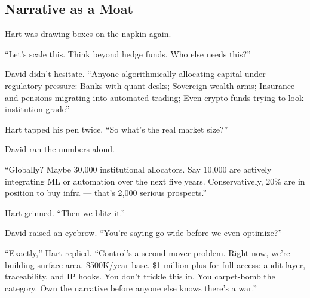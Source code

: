
\subsection{Narrative as a Moat}

Hart was drawing boxes on the napkin again.

``Let’s scale this. Think beyond hedge funds. Who else needs this?''

David didn’t hesitate.  
``Anyone algorithmically allocating capital under regulatory pressure:
  Banks with quant desks;  
  Sovereign wealth arms; 
  Insurance and pensions migrating into automated trading; 
  Even crypto funds trying to look institution-grade''

Hart tapped his pen twice. ``So what’s the real market size?''

David ran the numbers aloud.

``Globally? Maybe 30{,}000 institutional allocators.  
Say 10{,}000 are actively integrating ML or automation over the next five years.  
Conservatively, 20\% are in position to buy infra — that’s 2{,}000 serious prospects.''

Hart grinned. ``Then we blitz it.''

David raised an eyebrow. ``You’re saying go wide before we even optimize?''

``Exactly,'' Hart replied. ``Control’s a second-mover problem.  
Right now, we’re building surface area. \$500K/year base. \$1 million-plus for full access: audit layer, 
traceability, and IP hooks.  
You don’t trickle this in. You carpet-bomb the category. Own the narrative before anyone else knows 
there’s a war.''

\medskip

